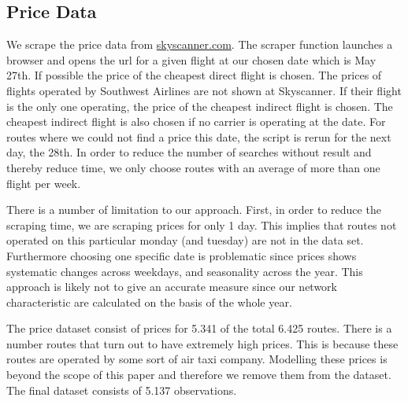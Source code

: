 \subsection{Price Data}
We scrape the price data from \url{skyscanner.com}. The scraper function launches a browser and opens the url for a given flight at our chosen date which is May 27th. If possible the price of the cheapest direct flight is chosen. The prices of flights operated by Southwest Airlines are not shown at Skyscanner. If their flight is the only one operating, the price of the cheapest indirect flight is chosen. The cheapest indirect flight is also chosen if no carrier is operating at the date. For routes where we could not find a price this date, the script is rerun for the next day, the 28th. In order to reduce the number of searches without result and thereby reduce time, we only choose routes with an average of more than one flight per week.

There is a number of limitation to our approach. First, in order to reduce the scraping time, we are scraping prices for only 1 day. This implies that routes not operated on this particular monday (and tuesday) are not in the data set. Furthermore choosing one specific date is problematic since prices shows systematic changes across weekdays, and seasonality across the year. This approach is likely not to give an accurate measure since our network characteristic are calculated on the basis of the whole year. 

The price dataset consist of prices for 5.341 of the total 6.425 routes. There is a number routes that turn out to have extremely high prices. This is because these routes are operated by some sort of air taxi company. Modelling these prices is beyond the scope of this paper and therefore we remove them from the dataset. The final dataset consists of 5.137 observations.




